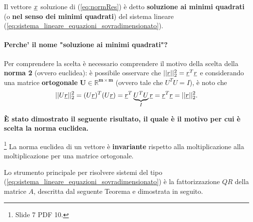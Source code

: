 \begin{definition}\label{def:soluzione_minimi_quadrati}
    Il vettore $\uline x$ soluzione di (\ref{eq:normRes}) è detto \textbf{soluzione ai minimi quadrati} (o \textbf{nel senso dei minimi quadrati}) del sistema lineare (\ref{eq:sistema_lineare_equazioni_sovradimensionato}). 
\end{definition}

\paragraph{Perche' il nome "soluzione ai minimi quadrati"?} Per comprendere la scelta è necessario comprendere il motivo della scelta della \textbf{norma 2} (ovvero euclidea): è possibile osservare che $||\uline r||_2^2=\uline r^T\uline r$ e considerando una matrice \textbf{ortogonale} $\boldsymbol{U\in\mathbb R^{m\times m}}$ (ovvero tale che $U^TU=I$), è noto che 
\begin{equation*}
    ||U\uline r||_2^2=(U\uline r)^T(U\uline r)=\uline r^T\underbrace{U^TU}_I \uline r = \uline r^T\uline r = ||\uline r||_2^2.
\end{equation*}

\textbf{È stato dimostrato il seguente risultato, il quale è il motivo per cui è scelta la norma euclidea.}

\begin{theorem}\footnote{Slide 7 PDF 10.}
    La norma euclidea di un vettore è \textbf{invariante} rispetto alla moltiplicazione alla moltiplicazione per una matrice ortogonale.
\end{theorem}

Lo strumento principale per risolvere sistemi del tipo (\ref{eq:sistema_lineare_equazioni_sovradimensionato}) è la fattorizzazione $QR$ della matrice $A$, descritta dal seguente Teorema e dimostrata in seguito.

